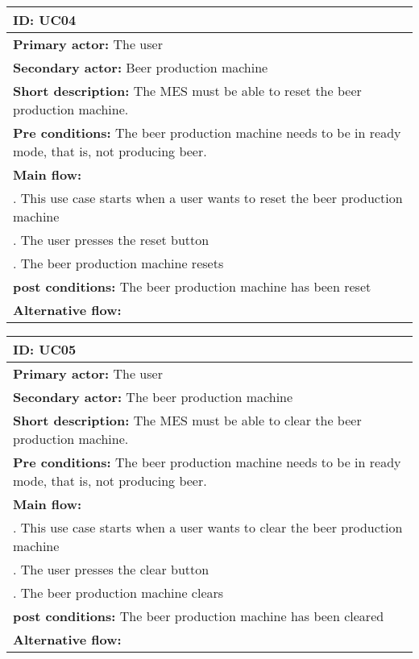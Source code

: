\begin{table}[ht]
    \begin{tabularx}{\textwidth}{|>{\RaggedRight}X|}
        \hline
        \textbf{ID:} UC04  \\
        \hline
        \textbf{Primary actor:} The user \\
        \hline
        \textbf{Secondary actor:} Beer production machine \\
        \hline
        \textbf{Short description:} The MES must be able to reset the beer
        production machine. \\
        \hline
        \textbf{Pre conditions:} The beer production machine needs to be in
        ready mode, that is, not producing beer. \\
        \hline
        \textbf{Main flow:} \\
        	1. This use case starts when a user wants to reset the beer
        	production machine \\
        	2. The user presses the reset button \\
			3. The beer production machine resets \\
		\hline
        \textbf{post conditions:} The beer production machine has been reset \\
        \hline
        \textbf{Alternative flow:} \\
        \hline
    \end{tabularx}
    \label{table:usecase_reset}
\end{table}

\begin{table}[ht]
    \begin{tabularx}{\textwidth}{|>{\RaggedRight}X|}
        \hline
        \textbf{ID:} UC05  \\
        \hline
        \textbf{Primary actor:} The user \\
        \hline
        \textbf{Secondary actor:} The beer production machine \\
        \hline
        \textbf{Short description:} The MES must be able to clear the beer
        production machine. \\
        \hline
        \textbf{Pre conditions:} The beer production machine needs to be in
        ready mode, that is, not producing beer. \\
        \hline
        \textbf{Main flow:} \\
        	1. This use case starts when a user wants to clear the beer
        	production machine \\
        	2. The user presses the clear button \\
			3. The beer production machine clears \\
		\hline
        \textbf{post conditions:} The beer production machine has been cleared \\
        \hline
        \textbf{Alternative flow:} \\
        \hline
    \end{tabularx}
    \label{table:usecase_clear}
\end{table}

